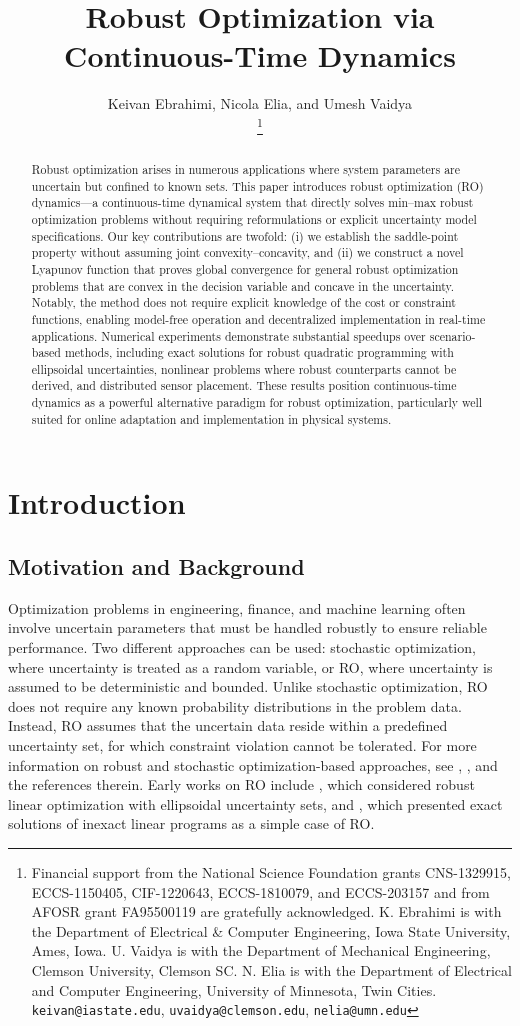 \documentclass[journal,twoside,web]{ieeecolor}
\title{\LARGE \bf Robust Optimization via Continuous-Time Dynamics}
\author{Keivan Ebrahimi, Nicola Elia, and Umesh Vaidya\\
\thanks{Financial support from the National Science Foundation grants CNS-1329915, ECCS-1150405, CIF-1220643, ECCS-1810079, and ECCS-203157 and from AFOSR grant FA95500119 are gratefully acknowledged. K. Ebrahimi is with the Department of Electrical \& Computer Engineering, Iowa State University, Ames, Iowa. U. Vaidya is with the Department of Mechanical Engineering, Clemson University, Clemson SC.  N. Elia is with the Department of Electrical and Computer Engineering, University of Minnesota, Twin Cities.
{\tt\small keivan@iastate.edu},
{\tt\small uvaidya@clemson.edu},
{\tt\small nelia@umn.edu}
}}
\newcommand{\rev}[1]{\textcolor{revisionblue}{#1}}
\begin{document}
\pagestyle{headings}
\setcounter{page}{1}

\maketitle

\begin{abstract}
\rev{Robust optimization arises in numerous applications where system parameters are uncertain but confined to known sets. This paper introduces robust optimization (RO) dynamics—a continuous-time dynamical system that directly solves min–max robust optimization problems without requiring reformulations or explicit uncertainty model specifications. Our key contributions are twofold: (i) we establish the saddle-point property without assuming joint convexity–concavity, and (ii) we construct a novel Lyapunov function that proves global convergence for general robust optimization problems that are convex in the decision variable and concave in the uncertainty. Notably, the method does not require explicit knowledge of the cost or constraint functions, enabling model-free operation and decentralized implementation in real-time applications. Numerical experiments demonstrate substantial speedups over scenario-based methods, including exact solutions for robust quadratic programming with ellipsoidal uncertainties, nonlinear problems where robust counterparts cannot be derived, and distributed sensor placement. These results position continuous-time dynamics as a powerful alternative paradigm for robust optimization, particularly well suited for online adaptation and implementation in physical systems.}
\end{abstract}

\section{Introduction}

\subsection*{\rev{Motivation and Background}}

\rev{Optimization problems in engineering, finance, and machine learning often involve uncertain parameters that must be handled robustly to ensure reliable performance.} Two different approaches can be used: stochastic optimization, where uncertainty is treated as a random variable, or RO, where uncertainty is assumed to be deterministic and bounded. Unlike stochastic optimization, RO does not require any known probability distributions in the problem data. Instead, RO assumes that the uncertain data reside within a predefined uncertainty set, for which constraint violation cannot be tolerated. For more information on robust and stochastic optimization-based approaches, see \cite{bental2009}, \cite{bertsimas2011}, and the references therein. Early works on RO include \cite{soyster1976}, which considered robust linear optimization with ellipsoidal uncertainty sets, and \cite{falk1976}, which presented exact solutions of inexact linear programs as a simple case of RO.
\end{document}
